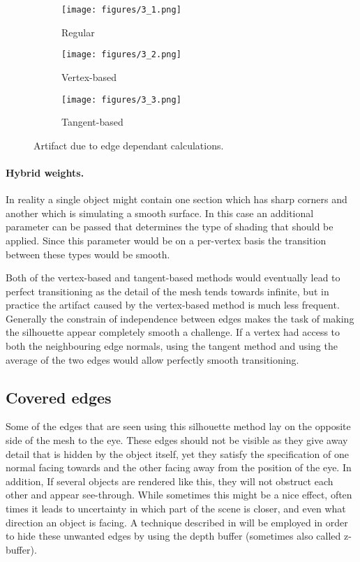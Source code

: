 \documentclass[a4paper, 12pt]{article}
\begin{document}
\begin{figure}[htbp!]
  \centering
  \begin{subfigure}{0.3\columnwidth}
    \texttt{[image: figures/3\_1.png]}
    \caption{Regular}
  \end{subfigure}
  \begin{subfigure}{0.3\columnwidth}
    \texttt{[image: figures/3\_2.png]}
    \caption{Vertex-based}
  \end{subfigure}
  \begin{subfigure}{0.3\columnwidth}
    \texttt{[image: figures/3\_3.png]}
    \caption{Tangent-based}
  \end{subfigure}
  \caption{Artifact due to edge dependant calculations.}
  \label{turn}
\end{figure}


\paragraph{Hybrid weights.}
In reality a single object might contain one section which has sharp corners and another which is simulating a smooth surface. In this case an additional parameter can be passed that determines the type of shading that should be applied. Since this parameter would be on a per-vertex basis the transition between these types would be smooth.

Both of the vertex-based and tangent-based methods would eventually lead to perfect transitioning as the detail of the mesh tends towards infinite, but in practice the artifact caused by the vertex-based method is much less frequent. Generally the constrain of independence between edges makes the task of making the silhouette appear completely smooth a challenge. If a vertex had access to both the neighbouring edge normals, using the tangent method and using the average of the two edges would allow perfectly smooth transitioning.


\subsection{Covered edges}
Some of the edges that are seen using this silhouette method lay on the opposite side of the mesh to the eye. These edges should not be visible as they give away detail that is hidden by the object itself, yet they satisfy the specification of one normal facing towards and the other facing away from the position of the eye. In addition, If several objects are rendered like this, they will not obstruct each other and appear see-through. While sometimes this might be a nice effect, often times it leads to uncertainty in which part of the scene is closer, and even what direction an object is facing. A technique described in \cite{Rossignac1992} will be employed in order to hide these unwanted edges by using the depth buffer (sometimes also called z-buffer).
\end{document}
